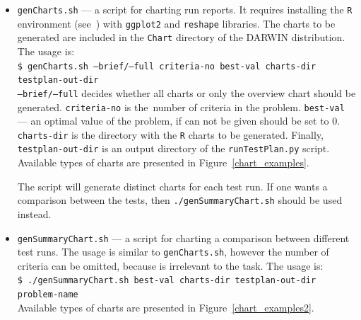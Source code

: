 \begin{itemize}
\item \texttt{genCharts.sh} --- a script for charting run reports. It requires
  installing the \texttt{R} environment (see~\cite{kee10}) with
  \texttt{ggplot2} and \texttt{reshape} libraries. The charts to be generated
  are included in the
  \texttt{Chart} directory of the DARWIN distribution. The usage is: \\
  \texttt{\$ genCharts.sh --brief/--full criteria-no best-val charts-dir
    testplan-out-dir} \\
  \texttt{--brief/--full} decides whether all charts or only the overview
  chart should be generated. \texttt{criteria-no} is the~number of criteria in
  the problem. \texttt{best-val} --- an optimal value of the problem, if can
  not be given should be set to $0$. \texttt{charts-dir} is the directory with
  the \texttt{R} charts to be generated. Finally, \texttt{testplan-out-dir} is
  an output directory of the \texttt{runTestPlan.py} script. Available types
  of charts are presented in Figure~\ref{chart_examples}.

  The script will generate distinct charts for each test run. If one wants a
  comparison between the tests, then \texttt{./genSummaryChart.sh} should be
  used instead.

\item \texttt{genSummaryChart.sh} --- a script for charting a comparison
  between different test runs. The usage is similar to \texttt{genCharts.sh},
  however the number of criteria can be omitted, because is irrelevant to the
  task. The usage is: \\
  \texttt{\$ ./genSummaryChart.sh best-val charts-dir testplan-out-dir
    problem-name}\\
  Available types of charts are presented in Figure~\ref{chart_examples2}.



\end{itemize}


